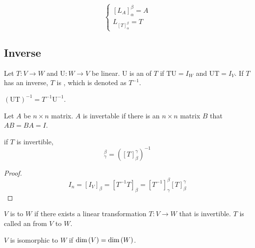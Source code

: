 \begin{theorem}
    \begin{equation}
        \begin{cases}
            [L_A]_\alpha^\beta = A \\
            L_{[T]_\alpha^\beta} = T
        \end{cases}
    \end{equation}
\end{theorem}


\subsection{Inverse}

\begin{definition}
	Let $T: V\rightarrow W$ and $\mathrm{U}:W \rightarrow V$ be linear. $\mathrm{U}$ is an    of $T$ if $\mathrm{TU} = I_W$ and $\mathrm{UT} = I_V$. If $T$ has an inverse, $T$ is   , which is denoted as $T^{-1}$.
\end{definition}

\begin{theorem}
    $(\mathrm{UT})^{-1} = T^{-1} \mathrm{U}^{-1}$.
\end{theorem}

\begin{definition}
	Let $A$ be $n \times n$ matrix. $A$ is invertable if there is an $n \times n$ matrix $B$ that $AB=BA=I$.
\end{definition}

\begin{theorem}
    if $T$ is invertible, 
	\begin{equation*}
		[T^{-1}]_\gamma^\beta = ([T]_\beta^\gamma)^{-1}
	\end{equation*}
\end{theorem}
\begin{proof}
	\begin{equation*}
		I_n = [I_V]_\beta = [T^{-1} T]_\beta = [T^{-1}]_\gamma^\beta [T]_\beta^\gamma
	\end{equation*}
\end{proof}

\begin{definition}
	$V$ is  to $W$ if there exists a linear transformation $T:V\rightarrow W$ that is invertible. $T$ is called an   from $V$ to $W$.
\end{definition}

\begin{theorem}
	$V$ is isomorphic to $W$ if $\displaystyle \text{dim}\left( V \right) = \displaystyle \text{dim}\left( W \right)$.
\end{theorem}

